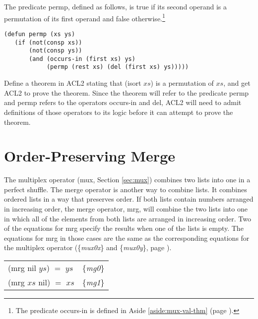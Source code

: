 \begin{ExerciseList}
\Exercise \label{ex:permp-isort}
The predicate 
\textsf{permp},
defined as follows, is true if its second operand
is a permutation of its first operand and false otherwise.\footnote{The
predicate \textsf{occurs-in} is defined in
Aside \ref{aside:mux-val-thm} (page \pageref{aside:mux-val-thm}).}
\label{defun:permp}
\begin{Verbatim}
(defun permp (xs ys)
   (if (not(consp xs))
       (not(consp ys))
       (and (occurs-in (first xs) ys)
            (permp (rest xs) (del (first xs) ys)))))
\end{Verbatim}
Define a theorem in ACL2 stating that \textsf{(isort $xs$)} is a
permutation of $xs$, and
get ACL2 to prove the theorem.
Since the theorem will refer to the predicate \textsf{permp}
and \textsf{permp} refers to the operators \textsf{occurs-in} and \textsf{del},
ACL2 will need to admit definitions of those operators
to its logic before it can attempt to prove the theorem.

\end{ExerciseList}

\section{Order-Preserving Merge}
\label{sec:mrg}

The multiplex operator (\textsf{mux}, Section \ref{sec:mux})
combines two lists into one in a perfect shuffle.
The merge operator is another way to combine lists.
It combines ordered lists
in a way that preserves order.
If both lists contain numbers arranged in increasing order,
the merge operator, \textsf{mrg},
will combine the two lists
into one in which all of the elements from both lists
are arranged in increasing order.
Two of the equations for \textsf{mrg}
specify the results when one of the lists is empty.
The equations for \textsf{mrg} in those cases are the same as
the corresponding equations for the multiplex operator
(\{\emph{mux0x}\} and \{\emph{mux0y}\}, page \pageref{def:mux}).

\begin{center}
\begin{tabular}{ll}
\textsf{(mrg nil $ys$) $=$ $ys$} & \{\emph{mg0}\} \\
\textsf{(mrg $xs$ nil) $=$ $xs$} & \{\emph{mg1}\} \\
\end{tabular}
\end{center}

